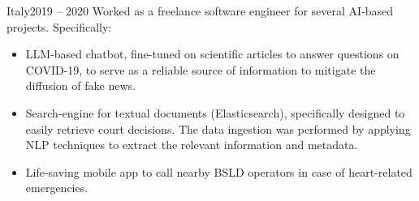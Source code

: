 	\medskip

	{Italy}{2019 – 2020}
	Worked as a freelance software engineer for several AI-based projects. Specifically:

	\begin{itemize}

		\item LLM-based chatbot, fine-tuned on scientific articles to answer questions on COVID-19, to serve as a reliable source of information to mitigate the diffusion of fake news.
		
		\item Search-engine for textual documents (Elasticsearch), specifically designed to easily retrieve court decisions. The data ingestion was performed by applying NLP techniques to extract the relevant information and metadata.
		
		\item Life-saving mobile app to call nearby BSLD operators in case of heart-related emergencies.
		
	\end{itemize}
